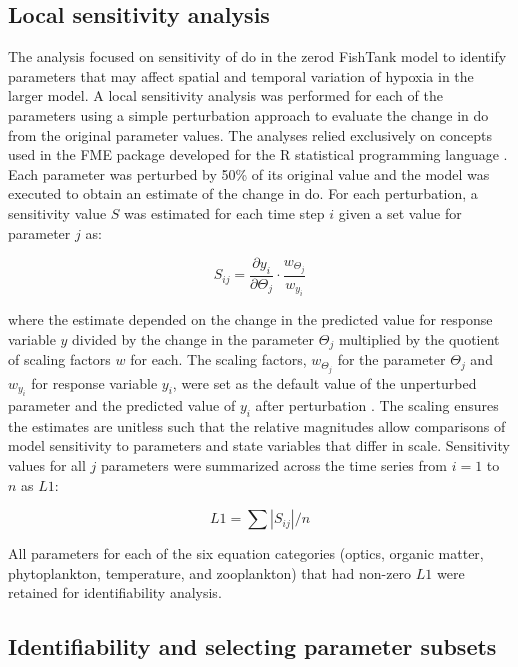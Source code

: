 \documentclass[letterpaper,12pt,oneside]{article}\usepackage[]{graphicx}\usepackage[]{color}
\begin{document}
\subsection{Local sensitivity analysis}

The analysis focused on sensitivity of \ac{do} in the \ac{zerod} FishTank model to identify parameters that may affect spatial and temporal variation of hypoxia in the larger model.  A local sensitivity analysis was performed for each of the parameters using a simple perturbation approach to evaluate the change in \ac{do} from the original parameter values.  The analyses relied exclusively on concepts used in the FME package developed for the R statistical programming language \citep{Soetaert10,RDCT16}. Each parameter was perturbed by 50\% of its original value and the model was executed to obtain an estimate of the change in \ac{do}.  For each perturbation, a sensitivity value $S$ was estimated for each time step $i$ given a set value for parameter $j$ as:

\begin{equation} \label{sijeqn}
S_{ij} = \frac{\partial y_i}{\partial \Theta_j}\cdot\frac{w_{\Theta_j}}{w_{y_i}}
\end{equation}

\noindent where the estimate depended on the change in the predicted value for response variable $y$ divided by the change in the parameter $\Theta_j$ multiplied by the quotient of scaling factors $w$ for each.  The scaling factors, $w_{\Theta_j}$ for the parameter $\Theta_j$ and $w_{y_i}$ for response variable $y_i$, were set as the default value of the unperturbed parameter and the predicted value of $y_i$ after perturbation \citep{Soetaert10}.  The scaling ensures the estimates are unitless such that the relative magnitudes allow comparisons of model sensitivity to parameters and state variables that differ in scale.  Sensitivity values for all $j$ parameters were summarized across the time series from $i = 1$ to $n$ as $L1$:

\begin{equation} \label{l1}
L1 = \sum|S_{ij}|/n
\end{equation}

All parameters for each of the six equation categories (optics, organic matter, phytoplankton, temperature, and zooplankton) that had non-zero $L1$ were retained for identifiability analysis.  

\subsection{Identifiability and selecting parameter subsets}
\end{document}
